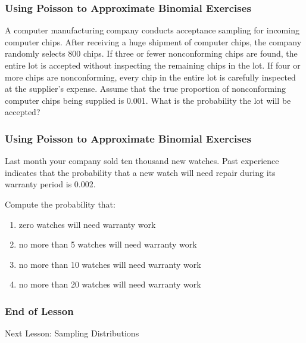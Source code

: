 \documentclass[xcolor=dvipsnames]{beamer}
\begin{document}
\begin{frame}
  \frametitle{Using Poisson to Approximate Binomial Exercises}
  {\ubung} A computer manufacturing company conducts acceptance
  sampling for incoming computer chips. After receiving a huge
  shipment of computer chips, the company randomly selects 800 chips.
  If three or fewer nonconforming chips are found, the entire lot is
  accepted without inspecting the remaining chips in the lot. If four
  or more chips are nonconforming, every chip in the entire lot is
  carefully inspected at the supplier's expense. Assume that the true
  proportion of nonconforming computer chips being supplied is 0.001.
  What is the probability the lot will be accepted?
\end{frame}

\begin{frame}
  \frametitle{Using Poisson to Approximate Binomial Exercises}
  {\ubung} Last month your company sold ten thousand new watches. Past
experience indicates that the probability that a new watch
will  need  repair  during  its  warranty  period  is  0.002.

Compute the probability that:
\begin{enumerate}
\item zero watches will need warranty work
\item no more than 5 watches will need warranty work
\item no more than 10 watches will need warranty work
\item no more than 20 watches will need warranty work
\end{enumerate}
\end{frame}

\begin{frame}
  \frametitle{End of Lesson}
Next Lesson: Sampling Distributions
\end{frame}
\end{document}
